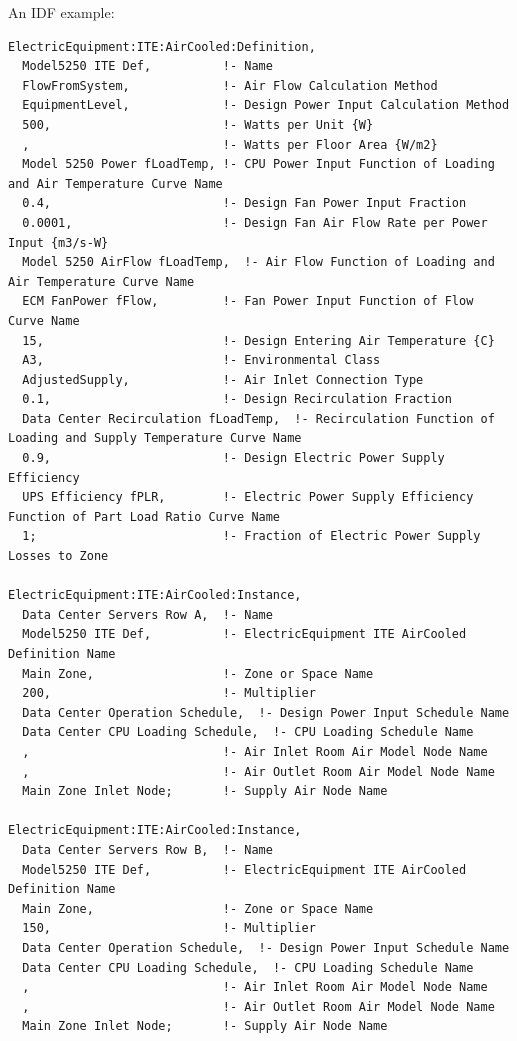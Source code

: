 An IDF example:

\begin{lstlisting}
ElectricEquipment:ITE:AirCooled:Definition,
  Model5250 ITE Def,          !- Name
  FlowFromSystem,             !- Air Flow Calculation Method
  EquipmentLevel,             !- Design Power Input Calculation Method
  500,                        !- Watts per Unit {W}
  ,                           !- Watts per Floor Area {W/m2}
  Model 5250 Power fLoadTemp, !- CPU Power Input Function of Loading and Air Temperature Curve Name
  0.4,                        !- Design Fan Power Input Fraction
  0.0001,                     !- Design Fan Air Flow Rate per Power Input {m3/s-W}
  Model 5250 AirFlow fLoadTemp,  !- Air Flow Function of Loading and Air Temperature Curve Name
  ECM FanPower fFlow,         !- Fan Power Input Function of Flow Curve Name
  15,                         !- Design Entering Air Temperature {C}
  A3,                         !- Environmental Class
  AdjustedSupply,             !- Air Inlet Connection Type
  0.1,                        !- Design Recirculation Fraction
  Data Center Recirculation fLoadTemp,  !- Recirculation Function of Loading and Supply Temperature Curve Name
  0.9,                        !- Design Electric Power Supply Efficiency
  UPS Efficiency fPLR,        !- Electric Power Supply Efficiency Function of Part Load Ratio Curve Name
  1;                          !- Fraction of Electric Power Supply Losses to Zone

ElectricEquipment:ITE:AirCooled:Instance,
  Data Center Servers Row A,  !- Name
  Model5250 ITE Def,          !- ElectricEquipment ITE AirCooled Definition Name
  Main Zone,                  !- Zone or Space Name
  200,                        !- Multiplier
  Data Center Operation Schedule,  !- Design Power Input Schedule Name
  Data Center CPU Loading Schedule,  !- CPU Loading Schedule Name
  ,                           !- Air Inlet Room Air Model Node Name
  ,                           !- Air Outlet Room Air Model Node Name
  Main Zone Inlet Node;       !- Supply Air Node Name

ElectricEquipment:ITE:AirCooled:Instance,
  Data Center Servers Row B,  !- Name
  Model5250 ITE Def,          !- ElectricEquipment ITE AirCooled Definition Name
  Main Zone,                  !- Zone or Space Name
  150,                        !- Multiplier
  Data Center Operation Schedule,  !- Design Power Input Schedule Name
  Data Center CPU Loading Schedule,  !- CPU Loading Schedule Name
  ,                           !- Air Inlet Room Air Model Node Name
  ,                           !- Air Outlet Room Air Model Node Name
  Main Zone Inlet Node;       !- Supply Air Node Name
\end{lstlisting}

